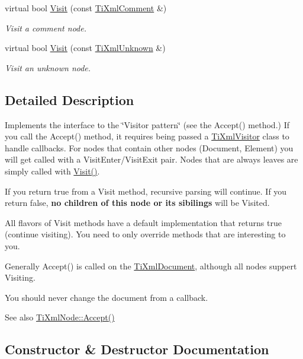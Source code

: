 \begin{DoxyCompactItemize}
virtual bool \hyperlink{class_ti_xml_visitor_a53a60e7a528627b31af3161972cc7fa2}{Visit} (const \hyperlink{class_ti_xml_comment}{Ti\+Xml\+Comment} \&)
\begin{DoxyCompactList}\small\item\em Visit a comment node. \end{DoxyCompactList}\item 
virtual bool \hyperlink{class_ti_xml_visitor_a7e284d607d275c51dac1adb58159ce28}{Visit} (const \hyperlink{class_ti_xml_unknown}{Ti\+Xml\+Unknown} \&)
\begin{DoxyCompactList}\small\item\em Visit an unknown node. \end{DoxyCompactList}\end{DoxyCompactItemize}


\subsection{Detailed Description}
Implements the interface to the \char`\"{}\+Visitor pattern\char`\"{} (see the Accept() method.) If you call the Accept() method, it requires being passed a \hyperlink{class_ti_xml_visitor}{Ti\+Xml\+Visitor} class to handle callbacks. For nodes that contain other nodes (Document, Element) you will get called with a Visit\+Enter/\+Visit\+Exit pair. Nodes that are always leaves are simply called with \hyperlink{class_ti_xml_visitor_afad71c71ce6473fb9b4b64cd92de4a19}{Visit()}.

If you return \textquotesingle{}true\textquotesingle{} from a Visit method, recursive parsing will continue. If you return false, {\bfseries no children of this node or its sibilings} will be Visited.

All flavors of Visit methods have a default implementation that returns \textquotesingle{}true\textquotesingle{} (continue visiting). You need to only override methods that are interesting to you.

Generally Accept() is called on the \hyperlink{class_ti_xml_document}{Ti\+Xml\+Document}, although all nodes suppert Visiting.

You should never change the document from a callback.

\begin{DoxySeeAlso}{See also}
\hyperlink{class_ti_xml_node_acc0f88b7462c6cb73809d410a4f5bb86}{Ti\+Xml\+Node\+::\+Accept()} 
\end{DoxySeeAlso}


\subsection{Constructor \& Destructor Documentation}
